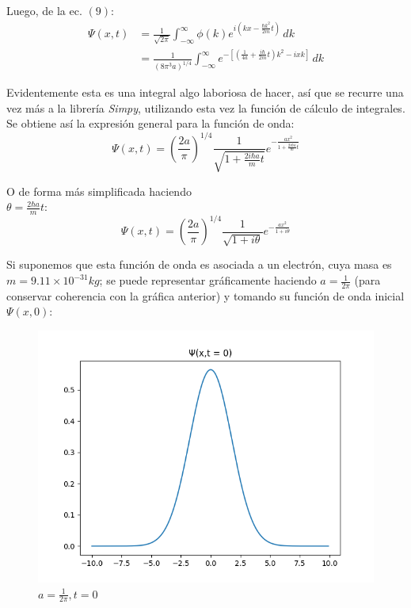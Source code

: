 Luego, de la ec. $(9)$:
\begin{align*}
    \Psi(x,t) & = \frac{1}{\sqrt{2\pi}} \int_{-\infty}^{\infty} \phi(k)e^{i(kx-\frac{\hbar k^2}{2m} t)}\,dk                                          \\
              & = \frac{1}{(8\pi^3 a)^{1/4}} \int_{-\infty}^{\infty} e^{-\left[ \left( \frac{1}{4a}+\frac{i\hbar}{2m}t \right)k^2 - ixk\right]} \,dk
\end{align*}

Evidentemente esta es una integral algo laboriosa de hacer, así que se recurre una vez más a la librería \emph{Simpy},
utilizando esta vez la función de cálculo de integrales.\\
Se obtiene así la expresión general para la función de onda:
\begin{equation*}
    \Psi(x,t) = \left( \frac{2a}{\pi} \right)^{1/4} \frac{1}{\sqrt{1+\frac{2i\hbar a}{m}t}} e^{-\frac{ax^2}{1+\frac{2i\hbar a}{m}t}}
\end{equation*}

O de forma más simplificada haciendo\\ $\theta=\frac{2\hbar a}{m}t$:
\begin{equation}
    \Psi(x,t) = \left( \frac{2a}{\pi} \right)^{1/4} \frac{1}{\sqrt{1+i\theta}} e^{-\frac{ax^2}{1+i\theta}}
\end{equation}

Si suponemos que esta función de onda es asociada a un electrón, cuya masa es $m=9.11\times10^{-31} kg$; se puede
representar gráficamente haciendo $a=\frac{1}{2\pi}$ (para conservar coherencia con la gráfica anterior)
y tomando su función de onda inicial $\Psi(x,0)$:\\

\begin{figure}[H]
    \includegraphics[scale=0.45]{imagenes/graficas_particulalibre/psi(x,t).png}
    \caption{\emph{$a = \frac{1}{2\pi}, t = 0$}}
\end{figure}

